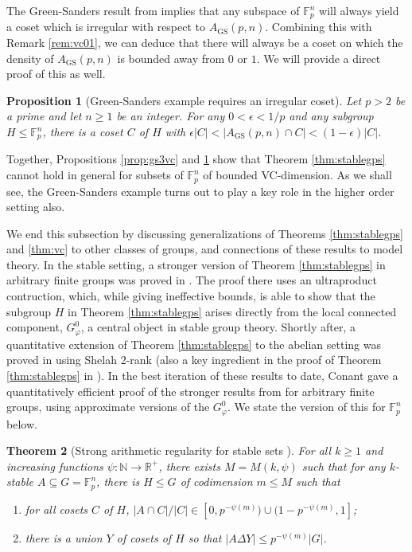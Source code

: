 \documentclass[12pt,oneside,british,a4wide]{amsart}
\newtheorem{theorem}{Theorem}[section]
\newtheorem{proposition}[theorem]{Proposition}
\numberwithin{equation}{section}
\theoremstyle{definition}
\def\F{\mathbb{F}}
\def\GS{\mathrm{GS}}
\def\e{\epsilon}
\begin{document}
The Green-Sanders result from  \cite{Green.2015qy4} implies that any subspace of $\F_p^n$ will always yield a coset which is irregular with respect to $A_{\GS}(p,n)$. Combining this with Remark \ref{rem:vc01}, we can deduce that there will always be a coset on which the density of $A_{\GS}(p,n)$ is bounded away from $0$ or $1$. We will provide a direct proof of this as well.

\begin{proposition}[Green-Sanders example requires an irregular coset]\label{prop:gsvc}
Let $p>2$ be a prime and let $n\geq 1$ be an integer. For any $0<\e<1/p$ and any subgroup $H\leqslant \F_p^n$, there is a coset $C$ of $H$ with $\e|C|<|A_{\GS}(p,n)\cap C|< (1-\e)|C|$.   
\end{proposition}
 
Together, Propositions \ref{prop:gs3vc} and \ref{prop:gsvc} show that Theorem \ref{thm:stablegps} cannot hold in general for subsets of $\F_p^n$ of bounded VC-dimension.    As we shall see, the Green-Sanders example turns out to play a key role in the higher order setting also.

We end this subsection by discussing generalizations of Theorems \ref{thm:stablegps} and \ref{thm:vc} to other classes of groups, and connections of  these results to model theory.  In the stable setting, a stronger  version of Theorem \ref{thm:stablegps}  in arbitrary finite groups was proved in \cite{Conant.2017p4}. The proof there uses an ultraproduct contruction, which, while giving ineffective bounds, is able to show that the subgroup $H$ in Theorem \ref{thm:stablegps} arises directly from the local connected component, $G_{\varphi}^0$, a central object in stable group theory.  Shortly after, a quantitative extension of Theorem \ref{thm:stablegps} to the abelian setting was proved in \cite{Terry.2020} using Shelah 2-rank (also a key ingredient in the proof of Theorem \ref{thm:stablegps} in \cite{Terry.2019}).  In the best iteration of these results to date, Conant \cite{Conant.2020} gave a quantitatively efficient proof of the stronger results from \cite{Conant.2017p4} for arbitrary finite groups, using approximate versions of the $G_{\varphi}^0$. We state the version of this for $\F_p^n$ below.

\begin{theorem}[Strong arithmetic regularity for stable sets \cite{Conant.2017p4}]\label{thm:stablestructure}
For all $k\geq 1$ and increasing functions $\psi:\mathbb{N}\rightarrow \mathbb{R}^+$,  there exists  $M=M(k,\psi)$  such that for any  $k$-stable $A\subseteq G=\F_p^n$, there is $H\leqslant G$ of codimension $m\leq M$ such that 
\begin{enumerate}[label=\normalfont(\roman*)] 
\item for all cosets $C$ of $H$,  $|A\cap C|/|C|\in [0,p^{-\psi(m)})\cup (1-p^{-\psi(m)},1]$;
\item there is a union $Y$ of cosets of $H$ so that $|A\Delta Y|\leq p^{-\psi(m)}|G|$.
\end{enumerate} 
\end{theorem} 
\end{document}
